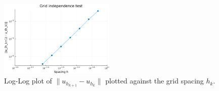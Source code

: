 \documentclass{article}
\numberwithin{equation}{section}
\theoremstyle{definition}
\newcommand{\ppn}[3]{\frac{\partial^{#1} #2}{\partial #3^{#1}}}
\begin{document}
\begin{figure}[H]
    \centering
    \includegraphics[width=0.49\textwidth]{fig6.png}
    \caption{Log-Log plot of $\|u_{h_{k+1}} - u_{h_k}\|$ plotted against the grid spacing $h_k$.}
    \label{fig:fig6}
\end{figure}


\end{document}
